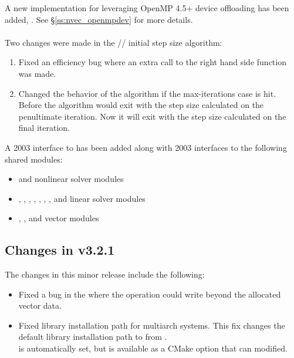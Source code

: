 A new {\nvector} implementation for leveraging OpenMP 4.5+ device offloading has
been added, {\nvecopenmpdev}. See \S\ref{ss:nvec_openmpdev} for more details.
\\
\\
\noindent Two changes were made in the {\cvode}/{\cvodes}/{\arkode} initial step
size algorithm:
\begin{enumerate}
  \item Fixed an efficiency bug where an extra call to the right hand side
        function was made.
  \item Changed the behavior of the algorithm if the max-iterations case is hit.
        Before the algorithm would exit with the step size calculated on the
        penultimate iteration. Now it will exit with the step size calculated
        on the final iteration.
\end{enumerate}

\noindent A {\F} 2003 interface to {\cvode} has been added along with {\F} 2003
interfaces to the following shared {\sundials} modules:
\begin{itemize}
  \item {\sunnonlinsolfixedpoint} and {\sunnonlinsolnewton} nonlinear solver modules
  \item {\sunlinsoldense}, {\sunlinsolband}, {\sunlinsolklu},
    {\sunlinsolpcg}, {\sunlinsolspbcgs}, {\sunlinsolspfgmr},
    {\sunlinsolspgmr}, and {\sunlinsolsptfqmr} linear solver modules
  \item {\nvecs}, {\nvecpthreads}, and {\nvecopenmp} vector modules
\end{itemize}


\subsection*{Changes in v3.2.1}

The changes in this minor release include the following:
\begin{itemize}
\item Fixed a bug in the {\cuda} {\nvector} where the  operation
  could write beyond the allocated vector data.
\item Fixed library installation path for multiarch systems. This fix changes the default
  library installation path to 
  from .\\
   is automatically
  set, but is available as a CMake option that can modified.
\end{itemize}

